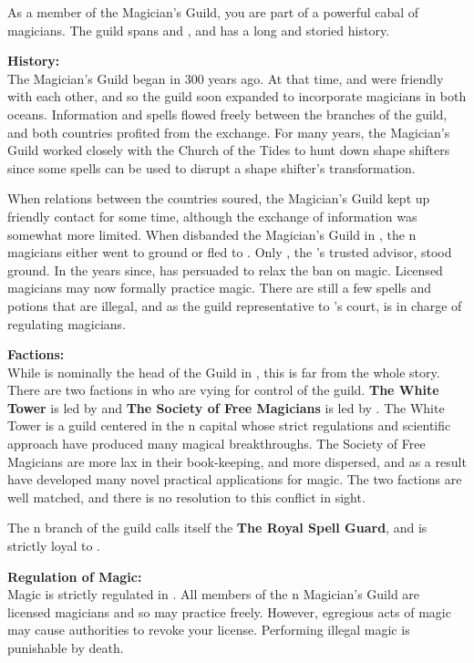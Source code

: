 \documentclass[blue]{NeptuneBall}
\begin{document}
\name{\bMagician{}}

As a member of the Magician's Guild, you are part of a powerful cabal of magicians. The guild spans \pAtlantis{} and \pPacifica{}, and has a long and storied history.

{\bf History:}\\
The Magician's Guild began in \pAtlantis{} 300 years ago. At that time, \pAtlantis{} and \pPacifica{} were friendly with each other, and so the guild soon expanded to incorporate magicians in both oceans. Information and spells flowed freely between the branches of the guild, and both countries profited from the exchange. For many years, the Magician's Guild worked closely with the Church of the Tides to hunt down shape shifters since some spells can be used to disrupt a shape shifter's transformation.

When relations between the countries soured, the Magician's Guild kept up friendly contact for some time, although the exchange of information was somewhat more limited. When \cKing{\King} \cKing{} disbanded the Magician's Guild in \pAtlantis{}, the \pAtlantis{}n magicians either went to ground or fled to \pPacifica{}. Only \cManta{}, the \cKing{\King}'s trusted advisor, stood \cManta{\their} ground. In the years since, \cManta{} has persuaded \cKing{} to relax the ban on magic. Licensed magicians may now formally practice magic. There are still a few spells and potions that are illegal, and as the guild representative to \cKing{\King} \cKing{}'s court, \cManta{} is in charge of regulating magicians.

{\bf Factions:}\\
While \cManta{} is nominally the head of the Guild in \pAtlantis{}, this is far from the whole story. There are two factions in \pAtlantis{} who are vying for control of the guild. {\bf The White Tower} is led by \cManta{} and {\bf The Society of Free Magicians} is led by \cWitch{\MYname}. The White Tower is a guild centered in the \pAtlantis{}n capital whose strict regulations and scientific approach have produced many magical breakthroughs. The Society of Free Magicians are more lax in their book-keeping, and more dispersed, and as a result have developed many novel practical applications for magic. The two factions are well matched, and there is no resolution to this conflict in sight.

The \pPacifica{}n branch of the guild calls itself the {\bf The Royal Spell Guard}, and is strictly loyal to \pPacifica{}.

{\bf Regulation of Magic:}\\
Magic is strictly regulated in \pAtlantis{}. All members of the \pAtlantis{}n Magician's Guild are licensed magicians and so may practice freely. However, egregious acts of magic may cause authorities to revoke your license. Performing illegal magic is punishable by death.
\end{document}
